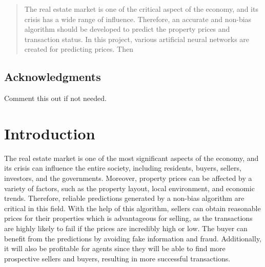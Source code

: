 \documentclass[12pt,twoside]{report}
\date{June 2022}
\begin{document}



\clearpage{\pagestyle{empty}\cleardoublepage}
\setcounter{page}{1}
\pagestyle{plain}
\graphicspath{ {./figures/} }

\begin{abstract}
The real estate market is one of the critical aspect of the economy, and its crisis has a wide range of influence. Therefore, an accurate and non-bias algorithm should be developed to predict the property prices and transaction status. In this project, various artificial neural networks are created for predicting prices. Then 
\end{abstract}

\cleardoublepage
\section*{Acknowledgments}
Comment this out if not needed.

\clearpage{\pagestyle{empty}\cleardoublepage}

\tableofcontents 


\clearpage{\pagestyle{empty}\cleardoublepage}
\setcounter{page}{1}
\fancyhead[LE,RO]{\slshape \rightmark}
\fancyhead[LO,RE]{\slshape \leftmark}

\chapter{Introduction}

The real estate market is one of the most significant aspects of the economy, and its crisis can influence the entire society, including residents, buyers, sellers, investors, and the governments. Moreover, property prices can be affected by a variety of factors, such as the property layout, local environment, and economic trends. Therefore, reliable predictions generated by a non-bias algorithm are critical in this field. With the help of this algorithm, sellers can obtain reasonable prices for their properties which is advantageous for selling, as the transactions are highly likely to fail if the prices are incredibly high or low. The buyer can benefit from the predictions by avoiding fake information and fraud. Additionally, it will also be profitable for agents since they will be able to find more prospective sellers and buyers, resulting in more successful transactions. 
\\
\end{document}
